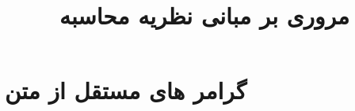 \documentclass{article}
\title{مروری بر مبانی نظریه محاسبه}
\date{}
\begin{document}
	\maketitle
	\section{
		گرامر های مستقل از متن
	}
\end{document}
